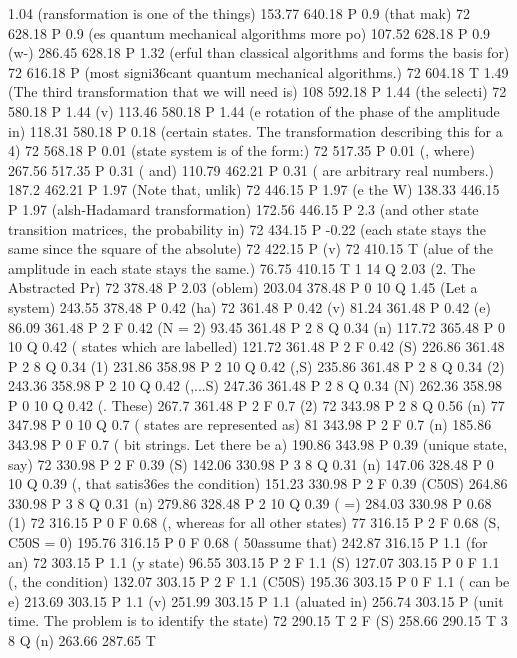 1.04 (ransformation is one of the things) 153.77 640.18 P
0.9 (that mak) 72 628.18 P
0.9 (es quantum mechanical algorithms more po) 107.52 628.18 P
0.9 (w-) 286.45 628.18 P
1.32 (erful than classical algorithms and forms the basis for) 72 616.18 P
(most signi\336cant quantum mechanical algorithms.) 72 604.18 T
1.49 (The third transformation that we will need is) 108 592.18 P
1.44 (the selecti) 72 580.18 P
1.44 (v) 113.46 580.18 P
1.44 (e rotation of the phase of the amplitude in) 118.31 580.18 P
0.18 (certain states. The transformation describing this for a 4) 72 568.18 P
0.01 (state system is of the form:) 72 517.35 P
0.01 (, where) 267.56 517.35 P
0.31 ( and) 110.79 462.21 P
0.31 ( are arbitrary real numbers.) 187.2 462.21 P
1.97 (Note that, unlik) 72 446.15 P
1.97 (e the W) 138.33 446.15 P
1.97 (alsh-Hadamard transformation) 172.56 446.15 P
2.3 (and other state transition matrices, the probability in) 72 434.15 P
-0.22 (each state stays the same since the square of the absolute) 72 422.15 P
(v) 72 410.15 T
(alue of the amplitude in each state stays the same.) 76.75 410.15 T
1 14 Q
2.03 (2. The Abstracted Pr) 72 378.48 P
2.03 (oblem) 203.04 378.48 P
0 10 Q
1.45 (Let a system) 243.55 378.48 P
0.42 (ha) 72 361.48 P
0.42 (v) 81.24 361.48 P
0.42 (e) 86.09 361.48 P
2 F
0.42 (N = 2) 93.45 361.48 P
2 8 Q
0.34 (n) 117.72 365.48 P
0 10 Q
0.42 ( states which are labelled) 121.72 361.48 P
2 F
0.42 (S) 226.86 361.48 P
2 8 Q
0.34 (1) 231.86 358.98 P
2 10 Q
0.42 (,S) 235.86 361.48 P
2 8 Q
0.34 (2) 243.36 358.98 P
2 10 Q
0.42 (,...S) 247.36 361.48 P
2 8 Q
0.34 (N) 262.36 358.98 P
0 10 Q
0.42 (. These) 267.7 361.48 P
2 F
0.7 (2) 72 343.98 P
2 8 Q
0.56 (n) 77 347.98 P
0 10 Q
0.7 ( states are represented as) 81 343.98 P
2 F
0.7 (n) 185.86 343.98 P
0 F
0.7 ( bit strings. Let there be a) 190.86 343.98 P
0.39 (unique state, say) 72 330.98 P
2 F
0.39 (S) 142.06 330.98 P
3 8 Q
0.31 (n) 147.06 328.48 P
0 10 Q
0.39 (, that satis\336es the condition) 151.23 330.98 P
2 F
0.39 (C\050S) 264.86 330.98 P
3 8 Q
0.31 (n) 279.86 328.48 P
2 10 Q
0.39 ( =) 284.03 330.98 P
0.68 (1) 72 316.15 P
0 F
0.68 (, whereas for all other states) 77 316.15 P
2 F
0.68 (S, C\050S = 0) 195.76 316.15 P
0 F
0.68 ( \050assume that) 242.87 316.15 P
1.1 (for an) 72 303.15 P
1.1 (y state) 96.55 303.15 P
2 F
1.1 (S) 127.07 303.15 P
0 F
1.1 (, the condition) 132.07 303.15 P
2 F
1.1 (C\050S) 195.36 303.15 P
0 F
1.1 ( can be e) 213.69 303.15 P
1.1 (v) 251.99 303.15 P
1.1 (aluated in) 256.74 303.15 P
(unit time. The problem is to identify the state) 72 290.15 T
2 F
(S) 258.66 290.15 T
3 8 Q
(n) 263.66 287.65 T
